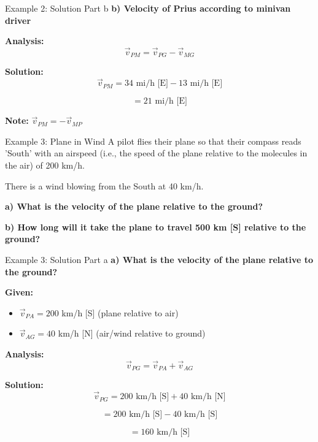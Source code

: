 \documentclass{beamer}
\begin{document}
\begin{frame}{Example 2: Solution Part b}
\textbf{b) Velocity of Prius according to minivan driver}



\textbf{Analysis:}
\[\vec{v}_{PM} = \vec{v}_{PG} - \vec{v}_{MG}\]



\textbf{Solution:}
\[\vec{v}_{PM} = 34 \text{ mi/h [E]} - 13 \text{ mi/h [E]}\]

\[= 21 \text{ mi/h [E]}\]



\vspace{0.5cm}

\textbf{Note:} \(\vec{v}_{PM} = -\vec{v}_{MP}\)
\end{frame}

\begin{frame}{Example 3: Plane in Wind}
A pilot flies their plane so that their compass reads 'South' with an airspeed (i.e., the speed of the plane relative to the molecules in the air) of 200 km/h.

There is a wind blowing from the South at 40 km/h.

\begin{center}
\end{center}

\textbf{a) What is the velocity of the plane relative to the ground?}

\textbf{b) How long will it take the plane to travel 500 km [S] relative to the ground?}
\end{frame}

\begin{frame}{Example 3: Solution Part a}
\textbf{a) What is the velocity of the plane relative to the ground?}



\textbf{Given:}
\begin{itemize}
\item \(\vec{v}_{PA} = 200\) km/h [S] (plane relative to air)
\item \(\vec{v}_{AG} = 40\) km/h [N] (air/wind relative to ground)
\end{itemize}



\textbf{Analysis:}
\[\vec{v}_{PG} = \vec{v}_{PA} + \vec{v}_{AG}\]



\textbf{Solution:}
\[\vec{v}_{PG} = 200 \text{ km/h [S]} + 40 \text{ km/h [N]}\]

\[= 200 \text{ km/h [S]} - 40 \text{ km/h [S]}\]

\[= 160 \text{ km/h [S]}\]
\end{frame}
\end{document}
